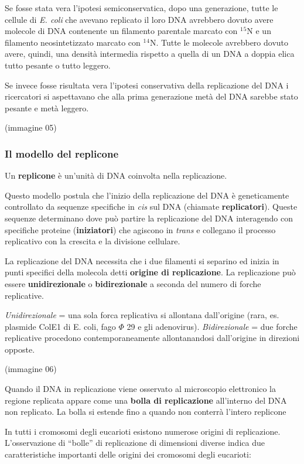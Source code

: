 \documentclass[]{article}
\begin{document}
Se fosse stata vera l'ipotesi semiconservatica, dopo una generazione,
tutte le cellule di \emph{E. coli} che avevano replicato il loro DNA
avrebbero dovuto avere molecole di DNA contenente un filamento parentale
marcato con \(^1\)\(^5\)N e un filamento neosintetizzato marcato con
\(^1\)\(^4\)N. Tutte le molecole avrebbero dovuto avere, quindi, una
densità intermedia rispetto a quella di un DNA a doppia elica tutto
pesante o tutto leggero.

Se invece fosse risultata vera l'ipotesi conservativa della replicazione
del DNA i ricercatori si aspettavano che alla prima generazione metà del
DNA sarebbe stato pesante e metà leggero.

(immagine 05)

\subsubsection{Il modello del replicone}\label{il-modello-del-replicone}

Un \textbf{replicone} è un'unità di DNA coinvolta nella replicazione.

Questo modello postula che l'inizio della replicazione del DNA è
geneticamente controllato da sequenze specifiche in \emph{cis} sul DNA
(chiamate \textbf{replicatori}). Queste sequenze determinano dove può
partire la replicazione del DNA interagendo con specifiche proteine
(\textbf{iniziatori}) che agiscono in \emph{trans} e collegano il
processo replicativo con la crescita e la divisione cellulare.

La replicazione del DNA necessita che i due filamenti si separino ed
inizia in punti specifici della molecola detti \textbf{origine di
replicazione}. La replicazione può essere \textbf{unidirezionale} o
\textbf{bidirezionale} a seconda del numero di forche replicative.

\emph{Unidirezionale} = una sola forca replicativa si allontana
dall'origine (rara, es. plasmide ColE1 di E. coli, fago \(\Phi\) 29 e
gli adenovirus). \emph{Bidirezionale} = due forche replicative procedono
contemporaneamente allontanandosi dall'origine in direzioni opposte.

(immagine 06)

Quando il DNA in replicazione viene osservato al microscopio elettronico
la regione replicata appare come una \textbf{bolla di replicazione}
all'interno del DNA non replicato. La bolla si estende fino a quando non
conterrà l'intero replicone

In tutti i cromosomi degli eucarioti esistono numerose origini di
replicazione. L'osservazione di ``bolle'' di replicazione di dimensioni
diverse indica due caratteristiche importanti delle origini dei
cromosomi degli eucarioti:
\end{document}
